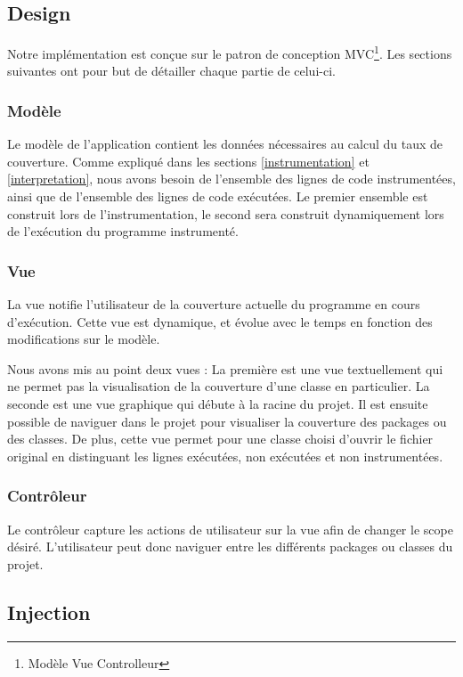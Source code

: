 \subsection{Design}

Notre implémentation est conçue sur le patron de conception MVC\footnote{Modèle Vue Controlleur}. Les sections suivantes ont pour but de détailler chaque partie de celui-ci.

\subsubsection{Modèle}

Le modèle de l'application contient les données nécessaires au calcul du taux de couverture. Comme expliqué dans les sections \ref{instrumentation} et \ref{interpretation}, nous avons besoin de l'ensemble des lignes de code instrumentées, ainsi que de l'ensemble des lignes de code exécutées. Le premier ensemble est construit lors de l'instrumentation, le second sera construit dynamiquement lors de l'exécution du programme instrumenté.
\newpage
\subsubsection{Vue}

La vue notifie l'utilisateur de la couverture actuelle du programme en cours d'exécution. Cette vue est dynamique, et évolue avec le temps en fonction des modifications sur le modèle.
\\
\par Nous avons mis au point deux vues :
La première est une vue textuellement qui ne permet pas la visualisation de la couverture d'une classe en particulier.
La seconde est une vue graphique qui débute à la racine du projet. Il est ensuite possible de naviguer dans le projet pour visualiser la couverture des packages ou des classes. De plus, cette vue permet pour une classe choisi d'ouvrir le fichier original en distinguant les lignes exécutées, non exécutées et non instrumentées. 

\subsubsection{Contrôleur}

Le contrôleur capture les actions de utilisateur sur la vue afin de changer le scope désiré. L'utilisateur peut donc naviguer entre les différents packages ou classes du projet.

\subsection{Injection}

